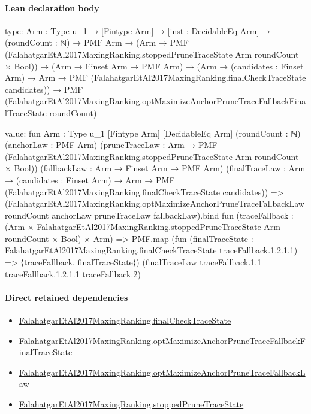 \documentclass[10pt]{article}
\begin{document}
\paragraph{Lean declaration body}
\begin{ReviewVerbatim}
type:
{Arm : Type u_1} →
  [Fintype Arm] →
    [inst : DecidableEq Arm] →
      (roundCount : ℕ) →
        PMF Arm →
          (Arm → PMF (FalahatgarEtAl2017MaxingRanking.stoppedPruneTraceState Arm roundCount × Bool)) →
            (Arm → Finset Arm → PMF Arm) →
              (Arm →
                  (candidates : Finset Arm) →
                    Arm → PMF (FalahatgarEtAl2017MaxingRanking.finalCheckTraceState candidates)) →
                PMF (FalahatgarEtAl2017MaxingRanking.optMaximizeAnchorPruneTraceFallbackFinalTraceState roundCount)

value:
fun {Arm : Type u_1} [Fintype Arm] [DecidableEq Arm] (roundCount : ℕ) (anchorLaw : PMF Arm)
    (pruneTraceLaw : Arm → PMF (FalahatgarEtAl2017MaxingRanking.stoppedPruneTraceState Arm roundCount × Bool))
    (fallbackLaw : Arm → Finset Arm → PMF Arm)
    (finalTraceLaw :
      Arm → (candidates : Finset Arm) → Arm → PMF (FalahatgarEtAl2017MaxingRanking.finalCheckTraceState candidates)) =>
  (FalahatgarEtAl2017MaxingRanking.optMaximizeAnchorPruneTraceFallbackLaw roundCount anchorLaw pruneTraceLaw
        fallbackLaw).bind
    fun (traceFallback : (Arm × FalahatgarEtAl2017MaxingRanking.stoppedPruneTraceState Arm roundCount × Bool) × Arm) =>
    PMF.map
      (fun (finalTraceState : FalahatgarEtAl2017MaxingRanking.finalCheckTraceState traceFallback.1.2.1.1) =>
        ⟨traceFallback, finalTraceState⟩)
      (finalTraceLaw traceFallback.1.1 traceFallback.1.2.1.1 traceFallback.2)
\end{ReviewVerbatim}

\paragraph{Direct retained dependencies}
\begin{itemize}\raggedright
\item \hyperlink{governing-declaration-2122ec79de2b6bf8}{Falahatgar\allowbreak{}Et\allowbreak{}Al2017\allowbreak{}Maxing\allowbreak{}Ranking.\allowbreak{}final\allowbreak{}Check\allowbreak{}Trace\allowbreak{}State}
\item \hyperlink{governing-declaration-25e49fb93f2a2a90}{Falahatgar\allowbreak{}Et\allowbreak{}Al2017\allowbreak{}Maxing\allowbreak{}Ranking.\allowbreak{}opt\allowbreak{}Maximize\allowbreak{}Anchor\allowbreak{}Prune\allowbreak{}Trace\allowbreak{}Fallback\allowbreak{}Final\allowbreak{}Trace\allowbreak{}State}
\item \hyperlink{governing-declaration-11c0abadb8fb548b}{Falahatgar\allowbreak{}Et\allowbreak{}Al2017\allowbreak{}Maxing\allowbreak{}Ranking.\allowbreak{}opt\allowbreak{}Maximize\allowbreak{}Anchor\allowbreak{}Prune\allowbreak{}Trace\allowbreak{}Fallback\allowbreak{}Law}
\item \hyperlink{governing-declaration-bb5991f407529737}{Falahatgar\allowbreak{}Et\allowbreak{}Al2017\allowbreak{}Maxing\allowbreak{}Ranking.\allowbreak{}stopped\allowbreak{}Prune\allowbreak{}Trace\allowbreak{}State}
\end{itemize}
\hypertarget{governing-declaration-a748033c8f33dee5}{}
\end{document}
